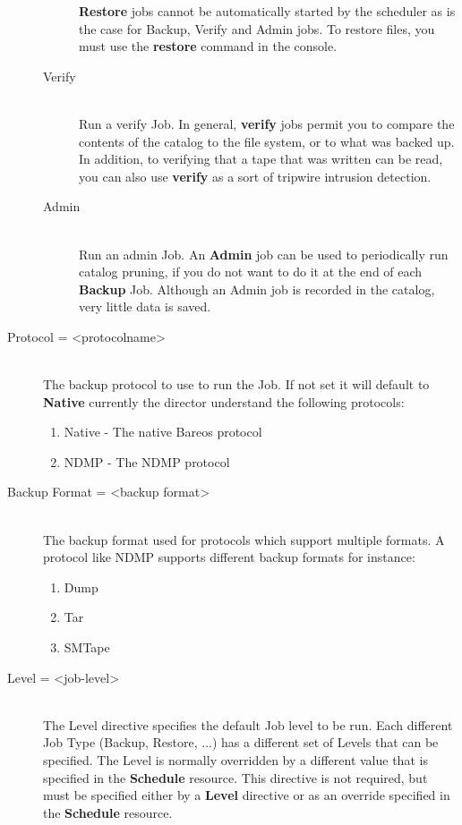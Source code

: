 \begin{description}
\begin{description}
{\bf Restore} jobs cannot be
automatically started by the scheduler as is the case for Backup, Verify
and Admin jobs. To restore files, you must use the {\bf restore} command
in the console.


\item [Verify] \hfill \\
Run a verify Job. In general, {\bf verify}  jobs permit you to compare the
contents of the catalog  to the file system, or to what was backed up. In
addition,  to verifying that a tape that was written can be read,  you can
also use {\bf verify} as a sort of tripwire  intrusion detection.

\item [Admin] \hfill \\
Run an admin Job. An {\bf Admin} job can  be used to periodically run catalog
pruning, if you  do not want to do it at the end of each {\bf Backup}  Job.
Although an Admin job is recorded in the  catalog, very little data is saved.
\end{description}

\item [Protocol = {\textless}protocolname{\textgreater}] \hfill \\
The backup protocol to use to run the Job. If not set it will default
to {\bf Native} currently the director understand the following protocols:
\begin{enumerate}
\item Native - The native Bareos protocol
\item NDMP - The NDMP protocol
\end{enumerate}

\item [Backup Format = {\textless}backup format{\textgreater}] \hfill \\
The backup format used for protocols which support multiple formats. A protocol
like NDMP supports different backup formats for instance:
\begin{enumerate}
\item Dump
\item Tar
\item SMTape
\end{enumerate}

\label{Level}
\item [Level = {\textless}job-level{\textgreater}] \hfill \\
The Level directive specifies the default Job level to be run.  Each
different Job Type (Backup, Restore, ...) has a different set of Levels
that can be specified.  The Level is normally overridden by a different
value that is specified in the {\bf Schedule} resource.  This directive
is not required, but must be specified either by a {\bf Level} directive
or as an override specified in the {\bf Schedule} resource.


\end{description}
